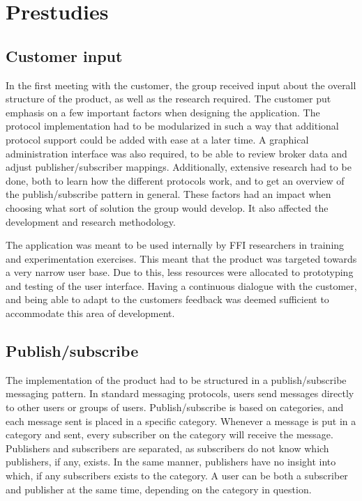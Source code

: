 
\chapter{Prestudies}
\label{ch:prestudies}

\section{Customer input}
\label{sec:prestudies-customer_input}

In the first meeting with the customer, the group received input about the overall structure of the product, as well as the research required. The customer put emphasis on a few important factors when designing the application. The protocol implementation had to be modularized in such a way that additional protocol support could be added with ease at a later time. A graphical administration interface was also required, to be able to review broker data and adjust publisher/subscriber mappings. Additionally, extensive research had to be done, both to learn how the different protocols work, and to get an overview of the publish/subscribe pattern in general. These factors had an impact when choosing what sort of solution the group would develop. It also affected the development and research methodology.

The application was meant to be used internally by FFI researchers in training and experimentation exercises. This meant that the product was targeted towards a very narrow user base. Due to this, less resources were allocated to prototyping and testing of the user interface. Having a continuous dialogue with the customer, and being able to adapt to the customers feedback was deemed sufficient to accommodate this area of development.

\section{Publish/subscribe}
\label{sec:prestudies-publish_subscribe}

The implementation of the product had to be structured in a publish/subscribe messaging pattern. In standard messaging protocols, users send messages directly to other users or groups of users. Publish/subscribe is based on categories, and each message sent is placed in a specific category. Whenever a message is put in a category and sent, every subscriber on the category will receive the message. Publishers and subscribers are separated, as subscribers do not know which publishers, if any, exists. In the same manner, publishers have no insight into which, if any subscribers exists to the category. A user can be both a subscriber and publisher at the same time, depending on the category in question.

